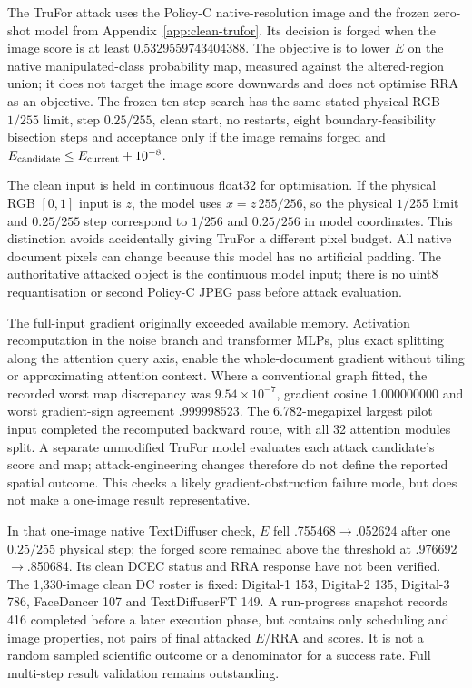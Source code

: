 The TruFor attack uses the Policy-C native-resolution image and the frozen zero-shot model from Appendix~\ref{app:clean-trufor}. Its decision is forged when the image score is at least 0.5329559743404388. The objective is to lower $E$ on the native manipulated-class probability map, measured against the altered-region union; it does not target the image score downwards and does not optimise RRA as an objective. The frozen ten-step search has the same stated physical RGB $1/255$ limit, step $0.25/255$, clean start, no restarts, eight boundary-feasibility bisection steps and acceptance only if the image remains forged and $E_{\rm candidate}\leq E_{\rm current}+10^{-8}$.

The clean input is held in continuous float32 for optimisation. If the physical RGB $[0,1]$ input is $z$, the model uses $x=z\,255/256$, so the physical $1/255$ limit and $0.25/255$ step correspond to $1/256$ and $0.25/256$ in model coordinates. This distinction avoids accidentally giving TruFor a different pixel budget. All native document pixels can change because this model has no artificial padding. The authoritative attacked object is the continuous model input; there is no uint8 requantisation or second Policy-C JPEG pass before attack evaluation.

The full-input gradient originally exceeded available memory. Activation recomputation in the noise branch and transformer MLPs, plus exact splitting along the attention query axis, enable the whole-document gradient without tiling or approximating attention context. Where a conventional graph fitted, the recorded worst map discrepancy was $9.54\times10^{-7}$, gradient cosine 1.000000000 and worst gradient-sign agreement .999998523. The 6.782-megapixel largest pilot input completed the recomputed backward route, with all 32 attention modules split. A separate unmodified TruFor model evaluates each attack candidate's score and map; attack-engineering changes therefore do not define the reported spatial outcome. This checks a likely gradient-obstruction failure mode, but does not make a one-image result representative.

In that one-image native TextDiffuser check, $E$ fell .755468$\rightarrow$.052624 after one $0.25/255$ physical step; the forged score remained above the threshold at .976692$\rightarrow$.850684. Its clean DCEC status and RRA response have not been verified. The 1,330-image clean DC roster is fixed: Digital-1 153, Digital-2 135, Digital-3 786, FaceDancer 107 and TextDiffuserFT 149. A run-progress snapshot records 416 completed before a later execution phase, but contains only scheduling and image properties, not pairs of final attacked $E$/RRA and scores. It is not a random sampled scientific outcome or a denominator for a success rate. Full multi-step result validation remains outstanding.

